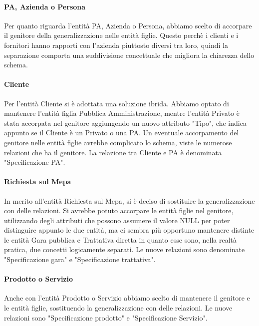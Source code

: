 \paragraph{PA, Azienda o Persona}
Per quanto riguarda l'entità PA, Azienda o Persona, abbiamo scelto di accorpare il genitore della generalizzazione nelle entità figlie. Questo perchè i clienti e i fornitori hanno rapporti con l'azienda piuttosto diversi tra loro, quindi la separazione comporta una suddivisione concettuale che migliora la chiarezza dello schema.
\paragraph{Cliente}
Per l'entità Cliente si è adottata una soluzione ibrida. Abbiamo optato di mantenere l'entità figlia Pubblica Amministrazione, mentre l'entità Privato è stata accorpata nel genitore aggiungendo un nuovo attributo "Tipo", che indica appunto se il Cliente è un Privato o una PA. Un eventuale accorpamento del genitore nelle entità figlie avrebbe complicato lo schema, viste le numerose relazioni che ha il genitore.
\newline
La relazione tra Cliente e PA è denominata "Specificazione PA".
\paragraph{Richiesta sul Mepa}
In merito all'entità Richiesta sul Mepa, si è deciso di sostituire la generalizzazione con delle relazioni. Si avrebbe potuto accorpare le entità figlie nel genitore, utilizzando degli attributi che possono assumere il valore NULL per poter distinguire appunto le due entità, ma ci sembra più opportuno mantenere distinte le entità Gara pubblica e Trattativa diretta in quanto esse sono, nella realtà pratica, due concetti logicamente separati.
Le nuove relazioni sono denominate "Specificazione gara" e "Specificazione trattativa".
\paragraph{Prodotto o Servizio}
Anche con l'entità Prodotto o Servizio abbiamo scelto di mantenere il genitore e le entità figlie, sostituendo la generalizzazione con delle relazioni. Le nuove relazioni sono "Specificazione prodotto" e "Specificazione Servizio".
